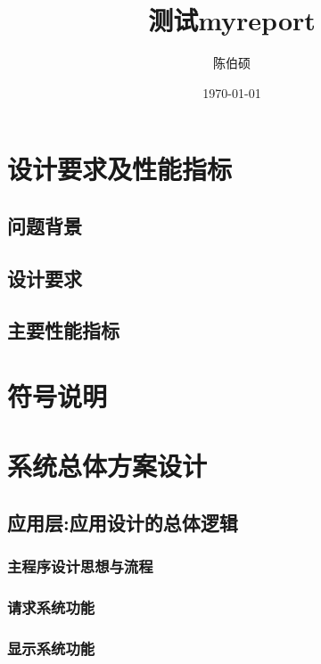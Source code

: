 \documentclass[pdfCover]{myreport} %
\title{测试myreport}
\author{陈伯硕}
\date{\today}
\begin{document}
\maketitle

\tableofcontents
\newpage

\section{设计要求及性能指标}
  \subsection{问题背景}
    
  \subsection{设计要求}
    
  \subsection{主要性能指标}
    

\section{符号说明}
  

\section{系统总体方案设计}
  \subsection{应用层:应用设计的总体逻辑}
    \subsubsection{主程序设计思想与流程}
      
    \subsubsection{请求系统功能}
      
    \subsubsection{显示系统功能}
      

\end{document}
